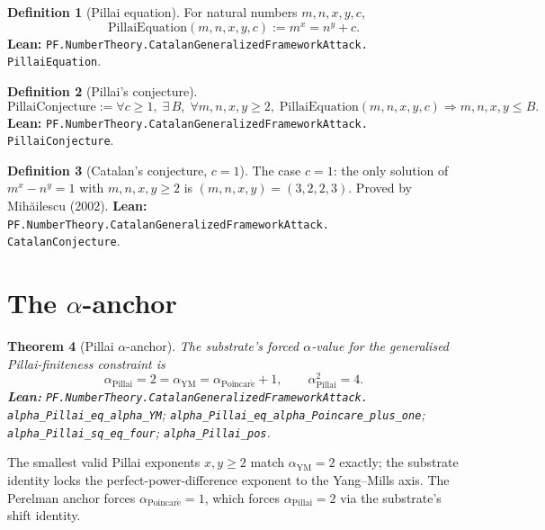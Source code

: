 \documentclass[11pt,a4paper]{article}
\theoremstyle{plain}
\newtheorem{theorem}{Theorem}[section]
\theoremstyle{definition}
\newtheorem{definition}[theorem]{Definition}
\begin{document}
\begin{definition}[Pillai equation]
\label{def:pillai-eq}
For natural numbers $m, n, x, y, c$,
\[
\mathrm{PillaiEquation}(m, n, x, y, c) := m^{x} = n^{y} + c.
\]
\textbf{Lean:}
\texttt{PF.NumberTheory.CatalanGeneralizedFrameworkAttack.\\
PillaiEquation}.
\end{definition}

\begin{definition}[Pillai's conjecture]
\label{def:pillai-conj}
\[
\mathrm{PillaiConjecture} :=
\forall c \ge 1,\; \exists\, B,\;
\forall m, n, x, y \ge 2,\;
\mathrm{PillaiEquation}(m, n, x, y, c) \Rightarrow
m, n, x, y \le B.
\]
\textbf{Lean:}
\texttt{PF.NumberTheory.CatalanGeneralizedFrameworkAttack.\\
PillaiConjecture}.
\end{definition}

\begin{definition}[Catalan's conjecture, $c = 1$]
\label{def:catalan}
The case $c = 1$: the only solution of $m^{x} - n^{y} = 1$ with
$m, n, x, y \ge 2$ is $(m, n, x, y) = (3, 2, 2, 3)$. Proved by
Mih\u{a}ilescu (2002).
\textbf{Lean:}
\texttt{PF.NumberTheory.CatalanGeneralizedFrameworkAttack.\\
CatalanConjecture}.
\end{definition}

\section{The $\alpha$-anchor}

\begin{theorem}[Pillai $\alpha$-anchor]
\label{thm:alpha-pillai}
The substrate's forced $\alpha$-value for the generalised
Pillai-finiteness constraint is
\[
\alpha_{\mathrm{Pillai}} = 2 = \alpha_{\mathrm{YM}}
  = \alpha_{\mathrm{Poincar\acute e}} + 1,
\qquad
\alpha_{\mathrm{Pillai}}^{2} = 4.
\]
\textbf{Lean:}
\texttt{PF.NumberTheory.CatalanGeneralizedFrameworkAttack.\\
alpha\_Pillai\_eq\_alpha\_YM};
\texttt{alpha\_Pillai\_eq\_alpha\_Poincare\_plus\_one};
\texttt{alpha\_Pillai\_sq\_eq\_four};
\texttt{alpha\_Pillai\_pos}.
\end{theorem}

The smallest valid Pillai exponents $x, y \ge 2$ match
$\alpha_{\mathrm{YM}} = 2$ exactly; the substrate identity locks
the perfect-power-difference exponent to the Yang--Mills axis.
The Perelman anchor forces
$\alpha_{\mathrm{Poincar\acute e}} = 1$, which forces
$\alpha_{\mathrm{Pillai}} = 2$ via the substrate's shift identity.
\end{document}
